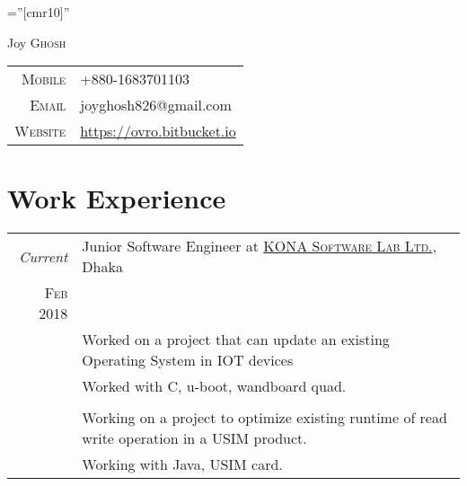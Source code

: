 \documentclass[a4paper,10pt]{article}
\begin{document}

\pagestyle{empty} %

\font\fb=''[cmr10]'' %

\par{\centering
    {\Huge Joy \textsc{Ghosh}
  }\bigskip\par}


\begin{tabular}{rl}
    \textsc{Mobile}     & +880-1683701103\\
    \textsc{Email}     & joyghosh826@gmail.com \\
    \textsc{Website}     & \href{https://ovro.bitbucket.io/}{https://ovro.bitbucket.io}
\end{tabular}

\section{Work Experience}
\begin{tabular}{r|p{11cm}}
 \emph{Current} & Junior Software Engineer at \href{http://www.konai.com}{\textsc{KONA Software Lab Ltd.}}, Dhaka \\
 \textsc{Feb 2018} & \\
 & Worked on a project that can update an existing Operating System in IOT devices \\ 
 & Worked with C, u-boot, wandboard quad. \\
& \\
& Working on a project to optimize existing runtime of read write \mbox{operation} in a USIM product. \\
& Working with Java, USIM card.

\end{tabular}
\end{document}

